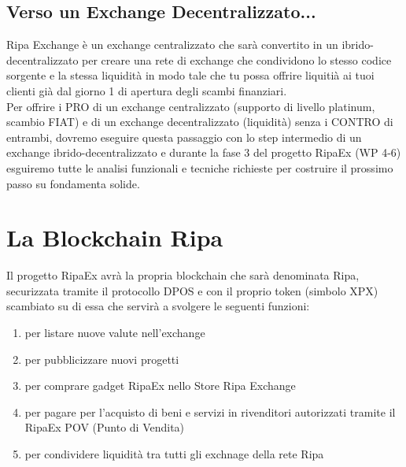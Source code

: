 \documentclass[11pt,fleqn,oneside]{book} %
\begin{document}
\section{Verso un Exchange Decentralizzato...}
Ripa Exchange è un exchange centralizzato che sarà convertito in un ibrido-decentralizzato per creare una rete di exchange
che condividono lo stesso codice sorgente e la stessa liquidità in modo tale che tu possa offrire liquitià ai tuoi clienti 
già dal giorno 1 di apertura degli scambi finanziari.\\

Per offrire i PRO di un exchange centralizzato (supporto di livello platinum, scambio FIAT) e di un exchange decentralizzato
(liquidità) senza i CONTRO di entrambi, dovremo eseguire questa passaggio con lo step intermedio di un exchange 
ibrido-decentralizzato e durante la fase 3 del progetto RipaEx (WP 4-6) esguiremo tutte le analisi funzionali e tecniche 
richieste per costruire il prossimo passo su fondamenta solide. 




\chapter{La Blockchain Ripa}
\label{sec:theRipaBlockchain}
Il progetto RipaEx avrà la propria blockchain che sarà denominata Ripa, securizzata tramite il protocollo DPOS e
con il proprio token \PHP (simbolo XPX) scambiato su di essa che servirà a svolgere le seguenti funzioni:
	\begin{enumerate}
		\item per listare nuove valute nell'exchange
		\item per pubblicizzare nuovi progetti
		\item per comprare gadget RipaEx nello Store Ripa Exchange
		\item per pagare per l'acquisto di beni e servizi in rivenditori autorizzati tramite il RipaEx POV (Punto di Vendita)
		\item per condividere liquidità tra tutti gli exchnage della rete Ripa
	\end{enumerate}
\end{document}
